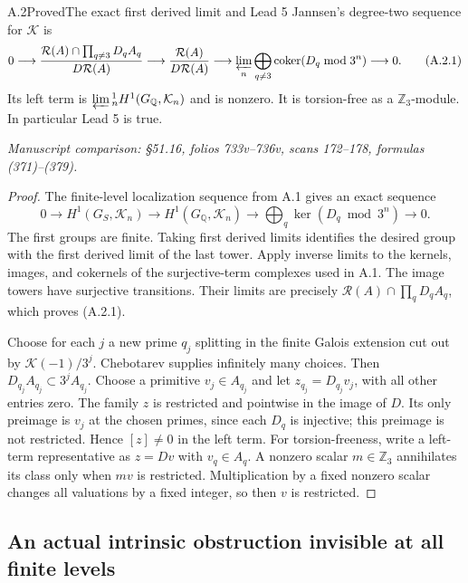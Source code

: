 \begin{statement}{A.2}{Proved}{The exact first derived limit and Lead 5}
Jannsen's degree-two sequence for $\mathcal K$ is
\[
 0\longrightarrow
 \frac{\mathcal R(A)\cap\prod_{q\ne3}D_qA_q}{D\mathcal R(A)}
 \longrightarrow\frac{\mathcal R(A)}{D\mathcal R(A)}
 \longrightarrow
 \varprojlim_n\bigoplus_{q\ne3}\operatorname{coker}(D_q\bmod3^n)
 \longrightarrow0.
 \tag{A.2.1}
\]
Its left term is $\varprojlim{}^1_n H^1(G_{\mathbb Q},\mathcal K_n)$
and is nonzero. It is torsion-free as a $\mathbb Z_3$-module.
In particular Lead 5 is true.
\par\smallskip\noindent\emph{Manuscript comparison: \S51.16,
folios 733v--736v, scans 172--178, formulas (371)--(379).}
\end{statement}
\begin{proof}
The finite-level localization sequence from A.1 gives an exact
sequence
\[
0\to H^1(G_S,\mathcal K_n)\to H^1(G_{\mathbb Q},\mathcal K_n)
 \to\bigoplus_q\ker(D_q\bmod3^n)\to0.
\]
The first groups are finite. Taking first derived limits identifies
the desired group with the first derived limit of the last tower.
Apply inverse limits to the kernels, images, and cokernels of the
surjective-term complexes used in A.1. The image towers have
surjective transitions. Their limits are precisely
$\mathcal R(A)\cap\prod_qD_qA_q$, which proves (A.2.1).

Choose for each $j$ a new prime $q_j$ splitting in the finite Galois
extension cut out by $\mathcal K(-1)/3^j$. Chebotarev \cite[V.3.23]{MilneCFT} supplies
infinitely many choices. Then $D_{q_j}A_{q_j}\subset3^jA_{q_j}$.
Choose a primitive $v_j\in A_{q_j}$ and let $z_{q_j}=D_{q_j}v_j$,
with all other entries zero. The family $z$ is restricted and
pointwise in the image of $D$. Its only preimage is $v_j$ at the
chosen primes, since each $D_q$ is injective; this preimage is not
restricted. Hence $[z]\ne0$ in the left term. For torsion-freeness,
write a left-term representative as $z=Dv$ with $v_q\in A_q$.
A nonzero scalar $m\in\mathbb Z_3$ annihilates its class only when
$mv$ is restricted. Multiplication by a fixed nonzero scalar changes
all valuations by a fixed integer, so then $v$ is restricted.
\end{proof}

\subsection{An actual intrinsic obstruction invisible at all finite levels}

